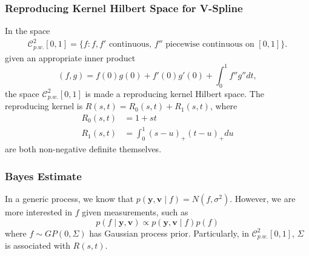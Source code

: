 \documentclass{beamer}
\begin{document}
\begin{frame}
\frametitle{Reproducing Kernel Hilbert Space for V-Spline}

In the space \begin{align*}
\mathcal{C}_{p.w.}^{2}[0,1]=\{f:f,f' \mbox{ continuous, } f'' \mbox{ piecewise continuous on } [0,1] \}.
\end{align*} 
given an appropriate inner product
\begin{equation}
(f,g)=f(0) g(0)+f'(0) g'(0)+\int_{0}^{1}f''g''dt,
\end{equation}
the space $\mathcal{C}_{p.w.}^{2}[0,1]$ is made a reproducing kernel Hilbert space. The reproducing kernel is $R(s,t)=R_0(s,t)+R_1(s,t)$, where
\begin{align} \label{TractorSplineKernelR0}
R_0(s,t)&=1+st \\ \label{TractorSplineKernelR1}
R_1(s,t)&=\int_{0}^{1} (s-u)_+(t-u)_+du
\end{align}
are both non-negative definite themselves.


\end{frame}


\begin{frame}
\frametitle{Bayes Estimate}


In a generic process, we know that $p(\mathbf{y},\mathbf{v}\mid f) = N(f,\sigma^2)$. However, we are more interested in $f$ given measurements, such as 
\begin{equation}
p(f\mid \mathbf{y},\mathbf{v}) \propto p(\mathbf{y},\mathbf{v}\mid f)p(f)
\end{equation}
where $f\sim GP(0,\Sigma)$ has Gaussian process prior. Particularly, in $\mathcal{C}_{p.w.}^{2}[0,1]$, $\Sigma$ is associated with $R(s,t)$. 

\end{frame}
\end{document}
